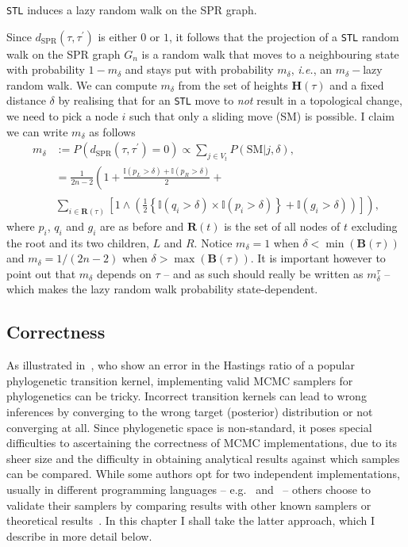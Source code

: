 \begin{remark}
 \verb|STL| induces a lazy random walk on the SPR graph.
\end{remark}
Since $d_\text{SPR}(\tau, \tau^\prime)$ is either $0$ or $1$, it follows that the projection of a \verb|STL| random walk on the SPR graph $G_n$ is a random walk that moves to a neighbouring state with probability $1- m_\delta$ and stays put with probability $m_\delta$, \textit{i.e.},  an $m_\delta-$lazy random walk.
We can compute $m_\delta$ from the set of heights $\boldsymbol H(\tau)$ and a fixed distance $\delta$ by realising that for an \verb|STL| move to \textit{not} result in a topological change, we need to pick a node $i$ such that only a sliding move (SM) is possible.
I claim we can write $m_{\delta}$ as follows
\begin{align}
 m_{\delta} &:= P(d_\text{SPR}(\tau, \tau^\prime) = 0) \propto  \sum_{j \in V_t} P( \text{SM} | j,  \delta), \\
  & = \frac{1}{2n-2} \left( 1 + \frac{\mathbb{I}(p_L > \delta) + \mathbb{I}(p_R > \delta)}{2} + \right. \\
  & \left. \sum_{i \in \boldsymbol R(\tau)} \left[ 1 \wedge \left(  \frac{1}{2}\left \{ \mathbb{I}(q_i > \delta) \times \mathbb{I}(p_i >  \delta)  \right \} + \mathbb{I}( g_i > \delta) \right) \right] \right),
\end{align}
where $p_i $, $q_i$  and $g_i$ are as before and $\boldsymbol R(t)$ is the set of all nodes of $t$ excluding the root and its two children, $L$ and $R$.
Notice $m_\delta = 1$ when $\delta < \min( \boldsymbol B(\tau))$ and $m_\delta = 1/ (2n-2)$ when $\delta  > \max( \boldsymbol B(\tau))$.
It is important however to point out that $m_\delta$ depends on $\tau$ -- and as such should really be written as $m^\tau_{\delta}$ -- which makes the lazy random walk probability state-dependent.

\subsection*{Correctness}
\label{sec:correctness}

As illustrated in~\cite{Holder2005}, who show an error in the Hastings ratio of a popular phylogenetic transition kernel, implementing valid MCMC samplers for phylogenetics can be tricky.
Incorrect transition kernels can lead to wrong inferences by converging to the wrong target (posterior) distribution or not converging at all.
Since phylogenetic space is non-standard, it poses special difficulties to ascertaining the correctness of MCMC implementations, due to its sheer size and the difficulty in obtaining analytical results against which samples can be compared.
While some authors opt for two independent  implementations, usually in different programming languages -- e.g.~\cite{Drummond2002} and~\cite{Dinh2017} -- others choose to validate their samplers by comparing results with other known samplers or theoretical results~\citep{Hoehna2008}.
In this chapter I shall take the latter approach, which I describe in more detail below.

